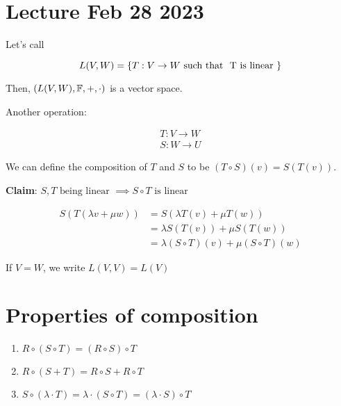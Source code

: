 \section{Lecture Feb 28 2023}





Let's call

$$
    L(V, W) = \left\{T: V \to W \text{ such that } \text{ T is linear }\right\}
$$

Then, $(L(V, W), \mathbb{F}, +, \cdot)$ is a vector space.

Another operation:

\begin{align*}
    T: V \to W \\
    S: W \to U
\end{align*}

We can define the composition of $T$ and $S$ to be $(T \circ S)(v) = S(T(v))$.

\textbf{Claim}: $S, T \text{ being linear } \implies S \circ T \text{ is linear }$

\begin{align*}
    S(T(\lambda v + \mu w))
     & = S(\lambda T(v) + \mu T(w))                  \\
     & = \lambda S(T(v)) + \mu S(T(w))               \\
     & = \lambda (S \circ T)(v) + \mu (S \circ T)(w)
\end{align*}

If $V = W$, we write $L(V, V) = L(V)$

\section*{Properties of composition}
\begin{enumerate}
    \item $R \circ (S \circ T) = (R \circ S) \circ T$
    \item $R \circ (S + T) = R \circ S + R \circ T$
    \item $S \circ (\lambda \cdot T) = \lambda \cdot (S \circ T) = (\lambda \cdot S) \circ T$
\end{enumerate}

